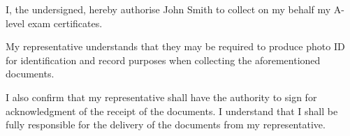 \documentclass[stdletternofrom]{newlfm}
\begin{document}
  \begin{newlfm}
    I, the undersigned, hereby authorise John Smith to collect on my behalf my
    A-level exam certificates.

    My representative understands that they may be required to produce photo
    ID for identification and record purposes when collecting the
    aforementioned documents.

    I also confirm that my representative shall have the authority to sign for
    acknowledgment of the receipt of the documents. I understand that I
    shall be fully responsible for the delivery of the documents from my
    representative.
  \end{newlfm}
\end{document}
